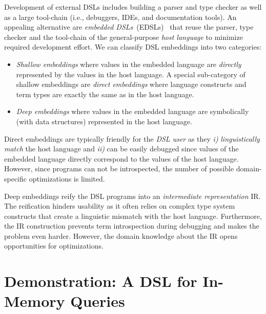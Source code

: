\documentclass{llncs}
\begin{document}
Development of external DSLs includes building a parser and type checker as well as a large tool-chain (i.e., debuggers, IDEs, and documentation tools). An appealing alternative are \emph{embedded DSLs}~(EDSLs)~\cite{Hudak96csur} that reuse the parser, type checker and the tool-chain of the general-purpose \emph{host language} to minimize required development effort. We can classify DSL embeddings into two categories:

\begin{itemize}

\item \emph{Shallow embeddings} where values in the embedded language are \emph{directly} represented by the values in the host language. A special sub-category of shallow embeddings are \emph{direct embeddings} where language constructs and term types are exactly the same as in the host language.

\item \emph{Deep embeddings} where values in the embedded language are symbolically (with data structures) represented in the host language.

\end{itemize}

Direct embeddings are typically friendly for the \emph{DSL user} as they \emph{i)} \emph{linguistically match} the host language and \emph{ii)} can be easily debugged since values of the embedded language directly correspond to the values of the host language. However, since programs can not be introspected, the number of possible domain-specific optimizations is limited.

Deep embeddings reify the DSL programs into an \emph{intermediate representation} IR. The reification hinders usability as it often relies on complex type system constructs that create a linguistic mismatch with the host language. Furthermore, the IR construction prevents term introspection during debugging and makes the problem even harder. However, the domain knowledge about the IR opens opportunities for optimizations.





\section{Demonstration: A DSL for In-Memory Queries}
\end{document}
